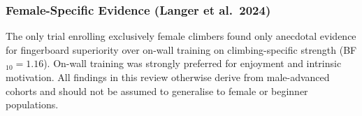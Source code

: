 \subsubsection{Female-Specific Evidence (Langer et al.\ 2024)}

The only trial enrolling exclusively female climbers \cite{LAS24} found only anecdotal evidence for fingerboard superiority over on-wall training on climbing-specific strength (BF$_{10}=1.16$). On-wall training was strongly preferred for enjoyment and intrinsic motivation. All findings in this review otherwise derive from male-advanced cohorts and should not be assumed to generalise to female or beginner populations.
